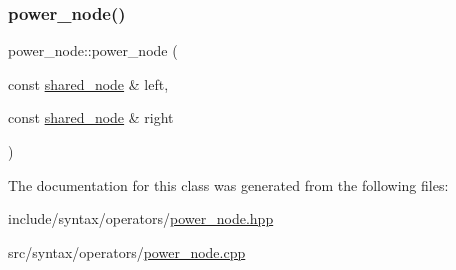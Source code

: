 \subsubsection{\texorpdfstring{power\+\_\+node()}{power\_node()}}
{\footnotesize\ttfamily power\+\_\+node\+::power\+\_\+node (\begin{DoxyParamCaption}\item[{const \hyperlink{namespacejawe_a3f307481d921b6cbb50cc8511fc2b544}{shared\+\_\+node} \&}]{left,  }\item[{const \hyperlink{namespacejawe_a3f307481d921b6cbb50cc8511fc2b544}{shared\+\_\+node} \&}]{right }\end{DoxyParamCaption})}



The documentation for this class was generated from the following files\+:\begin{DoxyCompactItemize}
\item 
include/syntax/operators/\hyperlink{power__node_8hpp}{power\+\_\+node.\+hpp}\item 
src/syntax/operators/\hyperlink{power__node_8cpp}{power\+\_\+node.\+cpp}\end{DoxyCompactItemize}
